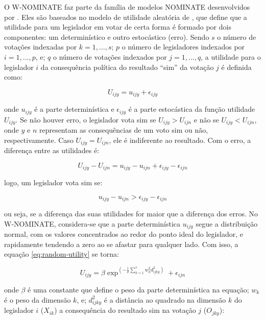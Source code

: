 \documentclass[a4paper,titlepage]{ppgi}\usepackage[]{graphicx}\usepackage[]{color}
\begin{document}
O W-NOMINATE faz parte da família de modelos NOMINATE desenvolvidos por
. Eles são baseados no modelo de utilidade aleatória de
, que define que a utilidade para um legislador em
votar de certa forma é formado por dois componentes: um determinístico e outro
estocástico (erro). Sendo $s$ o número de votações indexadas por $k = 1, ...,
s$; $p$ o número de legisladores indexados por $i = 1, ..., p$, e; $q$ o número
de votações indexados por $j = 1, ..., q$, a utilidade para o legislador $i$ da
consequência política do resultado ``sim'' da votação $j$ é definida como:

\begin{equation}
\label{eq:random-utility}
 U_{ijy} = u_{ijy} + \epsilon_{ijy}
\end{equation}

onde $u_{ijy}$ é a parte determinística e $\epsilon_{ijy}$ é a parte
estocástica da função utilidade $U_{ijy}$. Se não houver erro, o legislador vota sim se
$U_{ijy} > U_{ijn}$ e não se $U_{ijy} < U_{ijn}$, onde $y$ e $n$ representam as
consequências de um voto sim ou não, respectivamente. Caso $U_{ijy} = U_{ijn}$,
ele é indiferente ao resultado. Com o erro, a diferença entre as utilidades é:

\begin{equation}
U_{ijy} - U_{ijn} = u_{ijy} - u_{ijn} + \epsilon_{ijy} - \epsilon_{ijn}
\end{equation}

logo, um legislador vota sim se:

\begin{equation}
u_{ijy} - u_{ijn} > \epsilon_{ijy} - \epsilon_{ijn}
\end{equation}

ou seja, se a diferença das suas utilidades for maior que a diferença dos
erros. No W-NOMINATE, considera-se que a parte determinística $u_{ijy}$ segue a
distribuição normal, com os valores concentrados ao redor do ponto ideal do
legislador, e rapidamente tendendo a zero ao se afastar para qualquer lado. Com
isso, a equação \ref{eq:random-utility} se torna:

\begin{equation}
  U_{ijy} = \beta \exp^{\left( - \frac{1}{2} \sum\limits_{k=1}^s w_k^2 d_{ijky}^2 \right)} + \epsilon_{ijn}
\end{equation}

onde $\beta$ é uma constante que define o peso da parte determinística na
equação; $w_k$ é o peso da dimensão $k$, e; $d_{ijky}^2$ é a distância ao
quadrado na dimensão $k$ do legislador $i$ ($X_{ik}$) a consequência do
resultado sim na votação $j$ ($O_{jky}$):
\end{document}
